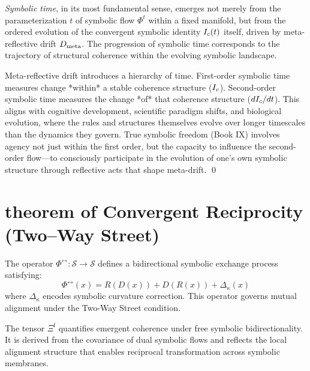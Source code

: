 \begin{definition}
\label{definition:bk7_symbolic_time_as_structural_evolution}
\emph{Symbolic time}, in its most fundamental sense, emerges not merely from the parameterization \(t\) of symbolic flow \(\Phi^t\) within a fixed manifold, but from the ordered evolution of the convergent symbolic identity \(I_c(t)\) itself, driven by meta-reflective drift \(D_{\mathrm{meta}}\). The progression of symbolic time corresponds to the trajectory of structural coherence within the evolving symbolic landscape.
\end{definition}
\begin{scholium}

\label{scholium:bk7_unnamed_scholium_02}Meta-reflective drift introduces a hierarchy of time. First-order symbolic time measures change *within* a stable coherence structure (\(I_c\)). Second-order symbolic time measures the change *of* that coherence structure (\(dI_c/dt\)). This aligns with cognitive development, scientific paradigm shifts, and biological evolution, where the rules and structures themselves evolve over longer timescales than the dynamics they govern. True symbolic freedom (Book IX) involves agency not just within the first order, but the capacity to influence the second-order flow—to consciously participate in the evolution of one's own symbolic structure through reflective acts that shape meta-drift. \qed {}
\end{scholium}
\section{theorem of Convergent Reciprocity (Two–Way Street)}
\label{sec:bk7_theorem_of_convergent_reciprocity_two_way_street}
\begin{definition}
\label{definition:bk7_two_way_flow_operator_}
The operator \(\Phi^{\leftrightarrow} : \mathcal{S} \to \mathcal{S}\) defines a bidirectional symbolic exchange process satisfying:
\[
\Phi^{\leftrightarrow}(x) = R(D(x)) + D(R(x)) + \Delta_\kappa(x)
\]
where \(\Delta_\kappa\) encodes symbolic curvature correction. This operator governs mutual alignment under the Two-Way Street condition.
\end{definition}
\begin{definition}
\label{definition:bk7_symbolic_convergence_tensor_f}
The tensor \(\Xi^{\mathrm{f}}\) quantifies emergent coherence under free symbolic bidirectionality. It is derived from the covariance of dual symbolic flows and reflects the local alignment structure that enables reciprocal transformation across symbolic membranes.
\end{definition}
